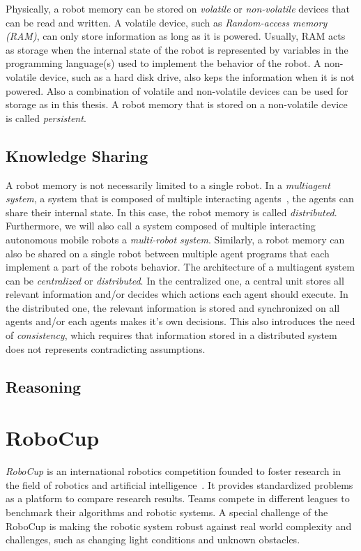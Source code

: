 Physically, a robot memory can be stored on \emph{volatile} or
\emph{non-volatile} devices that can be read and written. A volatile
device, such as \emph{Random-access memory (RAM)}, can only store
information as long as it is powered. Usually, RAM acts as storage
when the internal state of the robot is represented by variables in
the programming language(s) used to implement the behavior of the
robot.  A non-volatile device, such as a hard disk drive, also keps
the information when it is not powered. Also a combination of volatile
and non-volatile devices can be used for storage as in this thesis. A
robot memory that is stored on a non-volatile device is called
\emph{persistent}.

\subsection{Knowledge Sharing}
\label{sec:knowledge-sharing}
A robot memory is not necessarily limited to a single robot. In a
\emph{multiagent system}, a system that is composed of multiple
interacting agents~\cite{multiagentsystems}, the agents can share
their internal state. In this case, the robot memory is called
\emph{distributed}. Furthermore, we will also call a system composed
of multiple interacting autonomous mobile robots a \emph{multi-robot
  system}. Similarly, a robot memory can also be shared on a single
robot between multiple agent programs that each implement a part of
the robots behavior. The architecture of a multiagent system can be
\emph{centralized} or \emph{distributed}. In the centralized one,
a central unit stores all relevant information and/or decides which
actions each agent should execute. In the distributed one, the
relevant information is stored and synchronized on all agents and/or
each agents makes it's own decisions. This also introduces the need of
\emph{consistency}, which requires that information stored in a
distributed system does not represents contradicting assumptions.

\subsection{Reasoning}
\label{sec:reasoning}

\section{RoboCup}
\label{sec:robocup}
\emph{RoboCup} is an international robotics competition founded to
foster research in the field of robotics and artificial
intelligence~\cite{RoboCup-Paper,Gazsim-Thesis}. It provides
standardized problems as a platform to compare research results. Teams
compete in different leagues to benchmark their algorithms and robotic
systems. A special challenge of the RoboCup is making the robotic
system robust against real world complexity and challenges, such as
changing light conditions and unknown obstacles.

